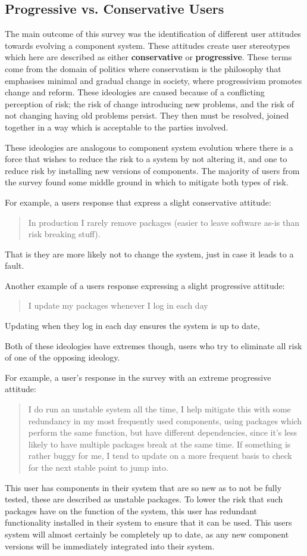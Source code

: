 \subsection{Progressive vs. Conservative Users}
The main outcome of this survey was the identification of different user attitudes towards evolving a component system.
These attitudes create user stereotypes which here are described as either \textbf{conservative} or \textbf{progressive}.
These terms come from the domain of politics where conservatism is the philosophy that emphasises minimal and gradual change in society,
where progressivism promotes change and reform.
These ideologies are caused because of a conflicting perception of risk; the risk of change introducing new problems, and the risk of not changing having old problems persist.
They then must be resolved, joined together in a way which is acceptable to the parties involved.

These ideologies are analogous to component system evolution where there is a force that wishes to reduce the risk to a system by not altering it,
and one to reduce risk by installing new versions of components.
The majority of users from the survey found some middle ground in which to mitigate both types of risk.

For example, a users response that express a slight conservative attitude:
\begin{quotation}
In production I rarely remove packages (easier to leave software as-is than risk breaking stuff).
\end{quotation}
That is they are more likely not to change the system, just in case it leads to a fault. 

Another example of a users response expressing a slight progressive attitude:
\begin{quotation}
I update my packages whenever I log in each day
\end{quotation}
Updating when they log in each day ensures the system is up to date, 

Both of these ideologies have extremes though, users who try to eliminate all risk of one of the opposing ideology.

For example, a user's response in the survey with an extreme progressive attitude:
\begin{quotation}
I do run an unstable system all the time, I help mitigate this with some redundancy in my most frequently used components, 
using packages which perform the same function, but have different dependencies, since it's less likely to have multiple packages break at the same time. 
If something is rather buggy for me, I tend to update on a more frequent basis to check for the next stable point to jump into.
\end{quotation}
This user has components in their system that are so new as to not be fully tested, these are described as unstable packages.
To lower the risk that such packages have on the function of the system, this user has redundant functionality installed in their system to ensure that it can be used.
This users system will almost certainly be completely up to date, as any new component versions will be immediately integrated into their system.


